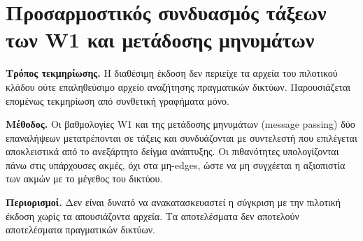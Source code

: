 \documentclass[11pt]{article}
\newcommand{\EvidenceMode}{συνθετική}
\begin{document}
\section*{Προσαρμοστικός συνδυασμός τάξεων των W1 και μετάδοσης μηνυμάτων}
\textbf{Τρόπος τεκμηρίωσης.} Η διαθέσιμη έκδοση δεν περιείχε τα αρχεία του
πιλοτικού κλάδου ούτε επαληθεύσιμο αρχείο αναζήτησης πραγματικών δικτύων.
Παρουσιάζεται επομένως τεκμηρίωση από \EvidenceMode{} γραφήματα μόνο.

\textbf{Μέθοδος.} Οι βαθμολογίες W1 και της μετάδοσης μηνυμάτων
(message passing) δύο επαναλήψεων μετατρέπονται σε τάξεις και συνδυάζονται
με συντελεστή που επιλέγεται αποκλειστικά από το ανεξάρτητο δείγμα ανάπτυξης.
Οι πιθανότητες υπολογίζονται πάνω στις υπάρχουσες ακμές, όχι στα μη-edges,
ώστε να μη συγχέεται η αξιοπιστία των ακμών με το μέγεθος του δικτύου.

\textbf{Περιορισμοί.} Δεν είναι δυνατό να ανακατασκευαστεί η σύγκριση με την
πιλοτική έκδοση χωρίς τα απουσιάζοντα αρχεία. Τα αποτελέσματα δεν αποτελούν
αποτελέσματα πραγματικών δικτύων.
\end{document}
